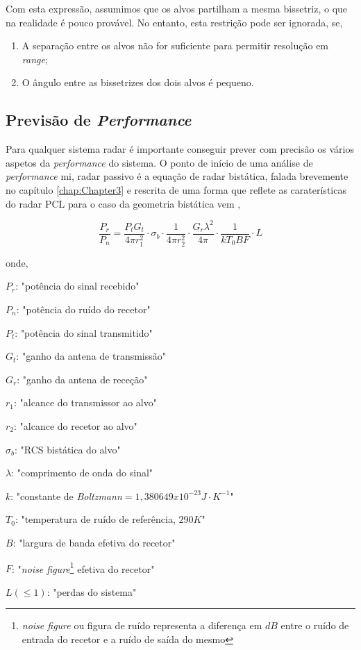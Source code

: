 Com esta expressão, assumimos que os alvos partilham a mesma bissetriz, o que na realidade é pouco provável. No entanto, esta restrição pode ser ignorada, se,
\begin{enumerate}
	\item A separação entre os alvos não for suficiente para permitir resolução em \textit{range};
	\item O ângulo entre as bissetrizes dos dois alvos é pequeno.
\end{enumerate}



\subsection{Previsão de \textit{Performance}}
Para qualquer sistema radar é importante conseguir prever com precisão os vários aspetos da \textit{performance} do sistema. O ponto de início de uma análise de \textit{performance} mi, radar passivo é a equação de radar bistática, falada brevemente no capítulo \ref{chap:Chapter3} e rescrita  de uma forma que reflete as caraterísticas do radar \gls{PCL} para o caso da geometria bistática vem \parencite{Griffiths2005},

\begin{equation} \label{2.8}
\dfrac{P_{r}}{P_{n}}= \dfrac{P_{t}G_{t}}{4\pi r^{2}_{1}}\cdot\sigma_{b}\cdot\dfrac{1}{4\pi r^{2}_{2}}\cdot\dfrac{G_{r}\lambda^{2}}{4\pi}\cdot\dfrac{1}{kT_{0}BF}\cdot L 
\end{equation}

onde,\par
$P_{r}$: "potência do sinal recebido"\par
$P_{n}$: "potência do ruído do recetor"\par
$P_{t}$: "potência do sinal transmitido"\par
$G_{t}$: "ganho da antena de transmissão"\par
$G_{r}$: "ganho da antena de receção"\par
$r_{1}$: "alcance do transmissor ao alvo"\par
$r_{2}$: "alcance do recetor ao alvo"\par
$\sigma_{b}$: "\gls{RCS} bistática do alvo"\par
$\lambda$: "comprimento de onda do sinal"\par
$k$: "constante de \textit{Boltzmann}$ =1,380649x10^{-23} J\cdot K^{-1}$"\par
$T_{0}$: "temperatura de ruído de referência, $290K$"\par
$B$: "largura de banda efetiva do recetor"\par
$F$: "\textit{noise figure}\footnote{\textit{noise figure} ou figura de ruído representa a diferença em $dB$ entre o ruído de entrada do recetor e a ruído de saída do mesmo} efetiva do recetor"\par
$L(\leq 1)$: "perdas do sistema"\par
 
